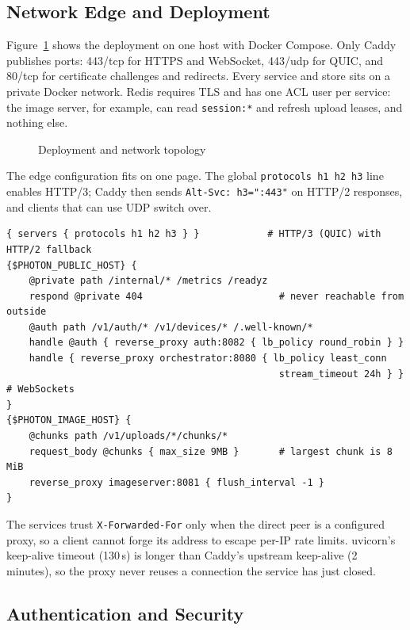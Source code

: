 \subsection{Network Edge and Deployment}

Figure~\ref{fig:deploy} shows the deployment on one host with Docker Compose. Only Caddy publishes ports: 443/tcp for HTTPS and WebSocket, 443/udp for QUIC, and 80/tcp for certificate challenges and redirects. Every service and store sits on a private Docker network. Redis requires TLS and has one ACL user per service: the image server, for example, can read \texttt{session:*} and refresh upload leases, and nothing else.

\begin{figure}[H]
\centering
{}
\caption{Deployment and network topology}\label{fig:deploy}
\end{figure}

The edge configuration fits on one page. The global \texttt{protocols h1 h2 h3} line enables HTTP/3; Caddy then sends \texttt{Alt-Svc: h3=":443"} on HTTP/2 responses, and clients that can use UDP switch over.

\begin{lstlisting}
{ servers { protocols h1 h2 h3 } }            # HTTP/3 (QUIC) with HTTP/2 fallback
{$PHOTON_PUBLIC_HOST} {
    @private path /internal/* /metrics /readyz
    respond @private 404                        # never reachable from outside
    @auth path /v1/auth/* /v1/devices/* /.well-known/*
    handle @auth { reverse_proxy auth:8082 { lb_policy round_robin } }
    handle { reverse_proxy orchestrator:8080 { lb_policy least_conn
                                                stream_timeout 24h } }   # WebSockets
}
{$PHOTON_IMAGE_HOST} {
    @chunks path /v1/uploads/*/chunks/*
    request_body @chunks { max_size 9MB }       # largest chunk is 8 MiB
    reverse_proxy imageserver:8081 { flush_interval -1 }
}
\end{lstlisting}

The services trust \texttt{X-Forwarded-For} only when the direct peer is a configured proxy, so a client cannot forge its address to escape per-IP rate limits. uvicorn's keep-alive timeout (130\,s) is longer than Caddy's upstream keep-alive (2 minutes), so the proxy never reuses a connection the service has just closed.

\subsection{Authentication and Security}

